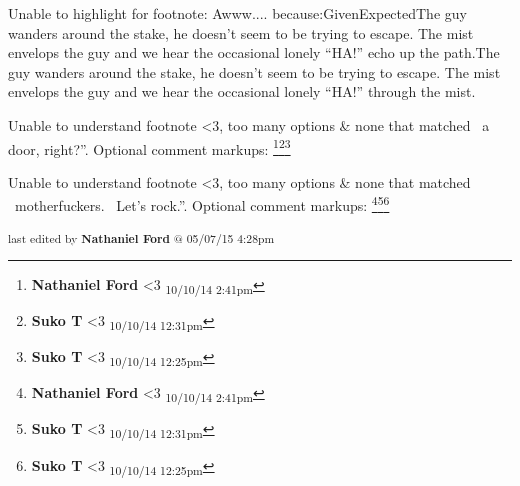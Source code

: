 	Unable to highlight for footnote: Awww.... because:GivenExpectedThe guy wanders around the stake, he doesn’t seem to be trying to escape.  The mist envelops the guy and we hear the occasional lonely “HA!” echo up the path.The guy wanders around the stake, he doesn’t seem to be trying to escape.  The mist envelops the guy and we hear the occasional lonely “HA!” through the mist.

	Unable to understand footnote <3, too many options & none that matched  a door, right?”. Optional comment markups: \footnote{\textbf{Nathaniel Ford }<3 \textsubscript{10/10/14 2:41pm}}\footnote{\textbf{Suko T }<3 \textsubscript{10/10/14 12:31pm}}\footnote{\textbf{Suko T }<3 \textsubscript{10/10/14 12:25pm}} 

	Unable to understand footnote <3, too many options & none that matched  motherfuckers.  Let’s rock.”. Optional comment markups: \footnote{\textbf{Nathaniel Ford }<3 \textsubscript{10/10/14 2:41pm}}\footnote{\textbf{Suko T }<3 \textsubscript{10/10/14 12:31pm}}\footnote{\textbf{Suko T }<3 \textsubscript{10/10/14 12:25pm}} 


\fi

\vspace{\fill}

\begin{flushright}
\textsubscript{last edited by \textbf{Nathaniel Ford} @ 05/07/15 4:28pm}
\end{flushright}

